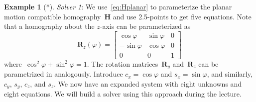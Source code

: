 \documentclass[11pt,a4paper]{article}
\theoremstyle{definition}
\newtheorem{example}{Example}
\renewcommand{\phi}{\varphi}
\newcommand{\mat}[1]{\bm{#1}}
\begin{document}
\begin{example}[*]
\emph{Solver 1}: We use~\eqref{eq:Hplanar} to parameterize the planar motion compatible
homography~$\mat{H}$ and use 2.5-points to get five equations. Note that a homography about the
$z$-axis can be parameterized as
\begin{equation}
    \mat{R}_z(\phi) = \begin{bmatrix}
        \cos{\phi} & \sin{\phi} & 0 \\
        -\sin{\phi} & \cos{\phi} & 0 \\
        0 &0 &1
    \end{bmatrix}
\end{equation}
where~$\cos^2{\phi}+\sin^2{\phi} = 1$. The rotation matrices~$\mat{R}_y$ and~$\mat{R}_z$
can be parametrized in analogously. Introduce $c_x=\cos{\phi}$ and $s_x=\sin{\phi}$, and similarly,
$c_y$, $s_y$, $c_z$, and $s_z$. We now have an expanded system with eight unknowns and
eight equations. We will build a solver using this approach during the lecture.


\end{example}
\end{document}
